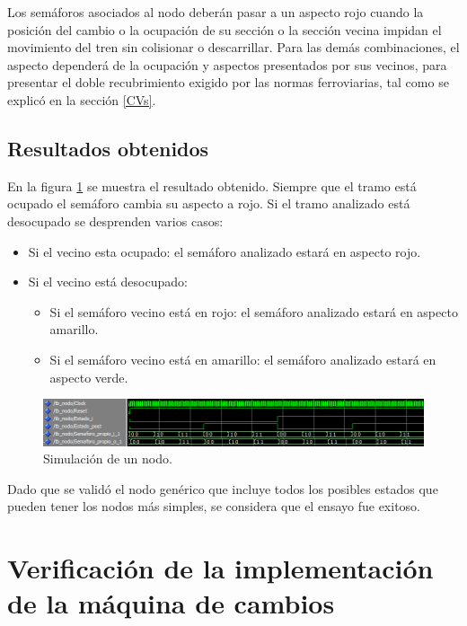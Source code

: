 		Los semáforos asociados al nodo deberán pasar a un aspecto rojo cuando la posición del cambio o la ocupación de su sección o la sección vecina impidan el movimiento del tren sin colisionar o descarrillar. Para las demás combinaciones, el aspecto dependerá de la ocupación y aspectos presentados por sus vecinos, para presentar el doble recubrimiento exigido por las normas ferroviarias, tal como se explicó en la sección \ref{CVs}.
			
		\subsection{Resultados obtenidos}
			
			En la figura \ref{fig:Test_Nodo} se muestra el resultado obtenido. Siempre que el tramo está ocupado el semáforo cambia su aspecto a rojo. Si el tramo analizado está desocupado se desprenden varios casos:
			
			\begin{itemize}
				\item Si el vecino esta ocupado: el semáforo analizado estará en aspecto rojo.
				\item Si el vecino está desocupado:
				\begin{itemize}
					\item Si el semáforo vecino está en rojo: el semáforo analizado estará en aspecto amarillo.
					\item Si el semáforo vecino está en amarillo:  el semáforo analizado estará en aspecto verde.
				\end{itemize}				 
			\end{itemize}
			
			\begin{figure}[h]
			\centering
			\includegraphics[scale=0.6]{./Figures/Test/Nodo}
				\caption{Simulación de un nodo.}
				\label{fig:Test_Nodo}
			\end{figure}
				
			Dado que se validó el nodo genérico que incluye todos los posibles estados que pueden tener los nodos más simples, se considera que el ensayo fue exitoso.	
	
\section{Verificación de la implementación de la máquina de cambios}


